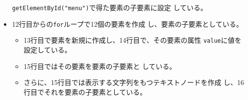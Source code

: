 \begin{Exec}
\begin{itemize}
       \texttt{getElementById("menu")}で得た要素の子要素に設定
       している。 
 \item 12行目からの\texttt{for}ループで12個の要素を作成
       し、要素の子要素としている。
       \begin{itemize}
	\item 13行目で要素を新規に作成し、14行目で、その要素の属性
        \texttt{value}に値を設定している。
	\item 15行目ではその要素を要素の子要素と
	      している。
	\item さらに、15行目では表示する文字列をもつテキストノードを作成
	      し、16行目でそれを要素の子要素としている。
       \end{itemize}
\end{itemize}
\end{Exec}

